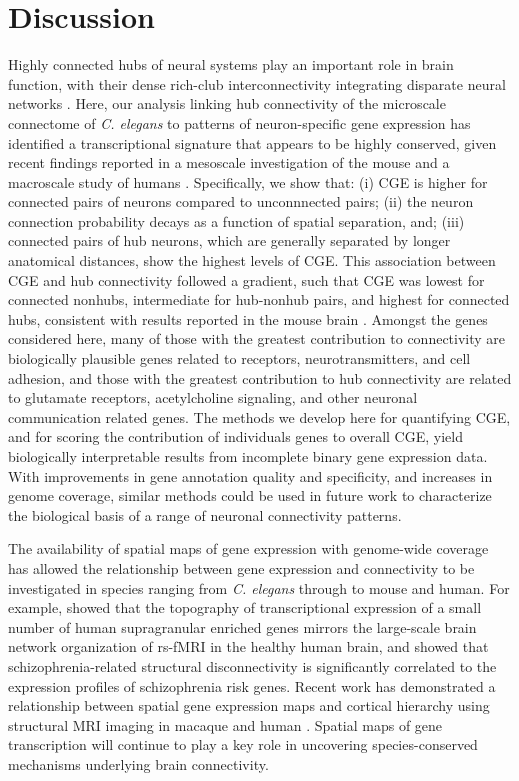 {\section{Discussion}
Highly connected hubs of neural systems play an important role in brain function, with their dense rich-club interconnectivity integrating disparate neural networks \citep{VandenHeuvel2013b, Fornito2015, DeReus2013b, VandenHeuvel2013a}.
Here, our analysis linking hub connectivity of the microscale connectome of \emph{C. elegans} to patterns of neuron-specific gene expression has identified a transcriptional signature that appears to be highly conserved, given recent findings reported in a mesoscale investigation of the mouse \citep{Fulcher2016} and a macroscale study of humans \citep{Vertes2016b}.
Specifically, we show that:
(i) CGE is higher for connected pairs of neurons compared to unconnnected pairs;
(ii) the neuron connection probability decays as a function of spatial separation, and;
(iii) connected pairs of hub neurons, which are generally separated by longer anatomical distances, show the highest levels of CGE.
This association between CGE and hub connectivity followed a gradient, such that CGE was lowest for connected nonhubs, intermediate for hub-nonhub pairs, and highest for connected hubs, consistent with results reported in the mouse brain \citep{Fulcher2016}.
Amongst the genes considered here, many of those with the greatest contribution to connectivity are biologically plausible genes related to receptors, neurotransmitters, and cell adhesion, and those with the greatest contribution to hub connectivity are related to glutamate receptors, acetylcholine signaling, and other neuronal communication related genes.
The methods we develop here for quantifying CGE, and for scoring the contribution of individuals genes to overall CGE, yield biologically interpretable results from incomplete binary gene expression data.
With improvements in gene annotation quality and specificity, and increases in genome coverage, similar methods could be used in future work to characterize the biological basis of a range of neuronal connectivity patterns.

The availability of spatial maps of gene expression with genome-wide coverage has allowed the relationship between gene expression and connectivity to be investigated in species ranging from \textit{C. elegans} through to mouse and human.
For example, \citet{Krienen2016} showed that the topography of transcriptional expression of a small number of human supragranular enriched genes mirrors the large-scale brain network organization of rs-fMRI in the healthy human brain, and \citet{Romme2017} showed that schizophrenia-related structural disconnectivity is significantly correlated to the expression profiles of schizophrenia risk genes.
Recent work has demonstrated a relationship between spatial gene expression maps and cortical hierarchy using structural MRI imaging in macaque and human \citep{Burt2018}.
Spatial maps of gene transcription will continue to play a key role in uncovering species-conserved mechanisms underlying brain connectivity.

}

